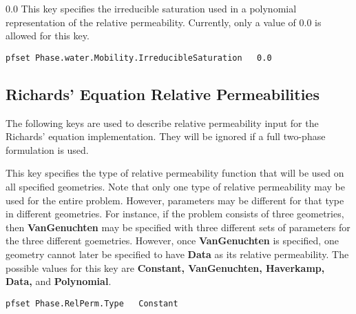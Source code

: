{0.0}
{
This key specifies the irreducible saturation 
used in a polynomial representation of the relative permeability.
Currently, only a value of 0.0 is allowed for this key.
}
\begin{display}\begin{verbatim}
pfset Phase.water.Mobility.IrreducibleSaturation   0.0
\end{verbatim}\end{display}


\subsection{Richards' Equation Relative Permeabilities}
\label{Richards RelPerm}

The following keys are used to describe relative permeability input for the
Richards' equation implementation.  They will be ignored if a full two-phase
formulation is used.

{
This key specifies the type of relative permeability function that will be used
on all specified geometries.  Note that only one type of relative permeability
may be used for the entire problem.  However, parameters may be different for
that type in different geometries.  For instance, if the problem consists of
three geometries, then {\bf VanGenuchten} may be specified with three different
sets of parameters for the three different goemetries.  However, once {\bf
VanGenuchten} is specified, one geometry cannot later be specified to have {\bf
Data} as its relative permeability.  The possible values for this key 
are {\bf Constant, VanGenuchten, Haverkamp, Data,} and {\bf  Polynomial}.
}
\begin{display}\begin{verbatim}
pfset Phase.RelPerm.Type   Constant
\end{verbatim}\end{display}

